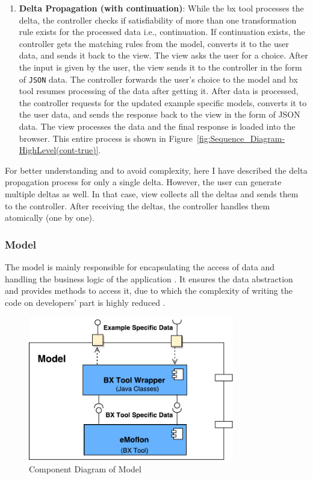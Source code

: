 \begin{enumerate}
    \item {\textbf{Delta Propagation (with continuation)}: While the bx tool processes the delta, the controller checks if satisfiability of more than one transformation rule exists for the processed data i.e., continuation. If continuation exists, the controller gets the matching rules from the model, converts it to the user data, and sends it back to the view. The view asks the user for a choice. After the input is given by the user, the view sends it to the controller in the form of \texttt{JSON} data. The controller forwards the user's choice to the model and bx tool resumes processing of the data after getting it. After data is processed, 
    the controller requests for the updated example specific models, converts it to the user data, and sends the response back to the view in the form of JSON data. The view processes the data and the final response is loaded into the browser. This entire process is shown in Figure~\ref{fig:Sequence_Diagram-HighLevel(cont-true)}.}
\end{enumerate}

For better understanding and to avoid complexity, here I have described the delta propagation process for only a single delta. However, the user can generate multiple deltas as well. In that case, view collects all the deltas and sends them to the controller. After receiving the deltas, the controller handles them atomically (one by one).

\subsubsection{Model}\label{subsubsec:design_model}
The model is mainly responsible for encapsulating the access of data and handling the business logic of the application \cite{designpattern-headfirst} \cite{mvc-arch}. It ensures the data abstraction and provides methods to access it, due to which the complexity of writing the code on developers' part is highly reduced \cite{mdd-webwithmvc}.

\begin{figure}
	\centering
	\includegraphics[width=0.8\textwidth]{figures/Component_Diagram-Model}
	\caption{Component Diagram of Model}
	\label{fig:Component_Diagram-Model}
\end{figure}

